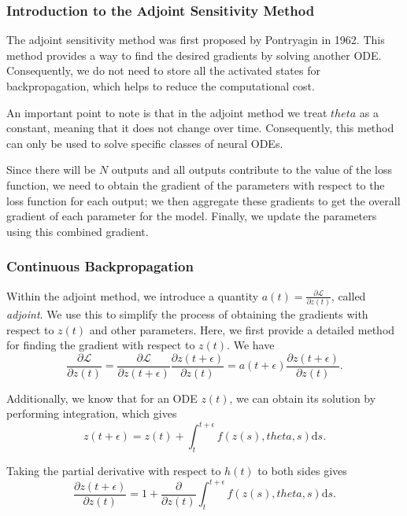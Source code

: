 \documentclass[a4paper,11pt,titlepage]{article}
\def\theta{theta}%
\theoremstyle{definition}
\theoremstyle{plain}
\theoremstyle{remark}
\begin{document}
\subsubsection{Introduction to the Adjoint Sensitivity Method}

The adjoint sensitivity method was first proposed by Pontryagin in 1962. This method provides a way to find the desired gradients by solving another ODE. Consequently, we do not need to store all the activated states for backpropagation, which helps to reduce the computational cost. 

An important point to note is that in the adjoint method we treat $\theta$ as a constant, meaning that it does not change over time. Consequently, this method can only be used to solve specific classes of neural ODEs.

Since there will be $N$ outputs and all outputs contribute to the value of the loss function, we need to obtain the gradient of the parameters with respect to the loss function for each output; we then aggregate these gradients to get the overall gradient of each parameter for the model. Finally, we update the parameters using this combined gradient.

\subsubsection{Continuous Backpropagation}

Within the adjoint method, we introduce a quantity $a(t) = \frac{\partial \mathcal{L}}{\partial z(t)}$, called \textit{adjoint}. We use this to simplify the process of obtaining the gradients with respect to $z(t)$ and other parameters. Here, we first provide a detailed method for finding the gradient with respect to $z(t)$. We have
\begin{equation}\label{eq3}
    \frac{\partial \mathcal{L}}{\partial z(t)} = \frac{\partial \mathcal{L}}{\partial z(t+\epsilon)}\frac{\partial z(t+\epsilon)}{\partial z(t)}=a(t+\epsilon)\frac{\partial z(t+\epsilon)}{\partial z(t)}.\tag{3}
\end{equation}

Additionally, we know that for an ODE $z(t)$, we can obtain its solution by performing integration, which gives
$$
z(t+\epsilon) = z(t)+\int_{t}^{t+\epsilon}f(z(s),\theta,s)\mathrm{d}s.
$$

Taking the partial derivative with respect to $h(t)$ to both sides gives
\begin{equation}\label{eq4}
\frac{\partial z(t+\epsilon)}{\partial z(t)} = 1+\frac{\partial}{\partial z(t)}\int_{t}^{t+\epsilon}f(z(s),\theta,s)\mathrm{d}s.\tag{4}
\end{equation}
\end{document}
